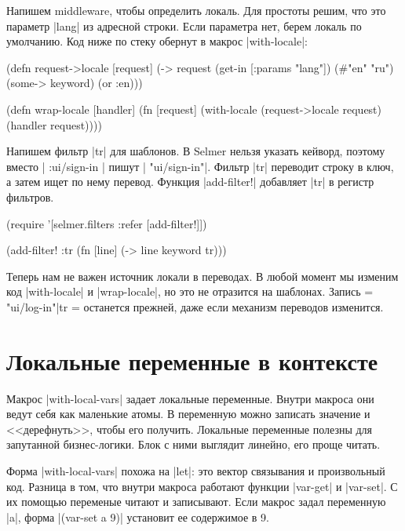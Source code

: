 Напишем middleware, чтобы определить локаль. Для простоты решим, что это
параметр \spverb|lang| из адресной строки. Если параметра нет, берем локаль по
умолчанию. Код ниже по стеку обернут в макрос \spverb|with-locale|:

\begin{english}
  \begin{clojure}
(defn request->locale [request]
  (-> request
      (get-in [:params "lang"])
      (#{"en" "ru"})
      (some-> keyword)
      (or :en)))

(defn wrap-locale [handler]
  (fn [request]
    (with-locale (request->locale request)
      (handler request))))
  \end{clojure}
\end{english}

Напишем фильтр \spverb|tr| для шаблонов. В Selmer нельзя указать кейворд,
поэтому вместо \spverb|{{ :ui/sign-in }}| пишут \spverb|{{ "ui/sign-in"}}|.
Фильтр \spverb|tr| переводит строку в ключ, а затем ищет по нему
перевод. Функция \spverb|add-filter!| добавляет \spverb|tr| в регистр фильтров.

\begin{english}
  \begin{clojure}
(require '[selmer.filters :refer [add-filter!]])

(add-filter! :tr
 (fn [line]
   (-> line keyword tr)))
  \end{clojure}
\end{english}

Теперь нам не важен источник локали в переводах. В любой момент мы изменим код
\spverb|with-locale| и \spverb|wrap-locale|, но это не отразится на
шаблонах. Запись \spverb={{ "ui/log-in"|tr }}= останется прежней, даже если
механизм переводов изменится.

\section{Локальные переменные в контексте}

Макрос \spverb|with-local-vars| задает локальные переменные. Внутри макроса они
ведут себя как маленькие атомы. В переменную можно записать значение и
<<дерефнуть>>, чтобы его получить. Локальные переменные полезны для запутанной
бизнес-логики. Блок с ними выглядит линейно, его проще читать.

Форма \spverb|with-local-vars| похожа на \spverb|let|: это вектор связывания и
произвольный код. Разница в том, что внутри макроса работают функции
\spverb|var-get| и \spverb|var-set|. С их помощью переменые читают и
записывают. Если макрос задал переменную \spverb|a|, форма
\spverb|(var-set a 9)| установит ее содержимое в 9.

